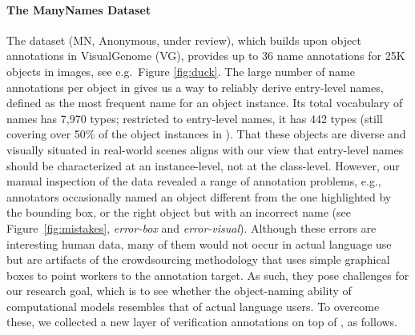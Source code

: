 \paragraph{The ManyNames Dataset}
The \mn dataset (MN, Anonymous, under review), which builds upon object annotations in VisualGenome (VG), provides up to 36 name annotations for 25K objects in images, see e.g.\ Figure \ref{fig:duck}.
The large number of name annotations per object in \mn gives us a way to reliably derive entry-level names, defined as the most frequent name for an object instance.
Its total vocabulary of names has 7,970 types; restricted to entry-level names, it has 442 types (still covering over 50\% of the object instances in \vg).
That these objects are diverse and visually situated in real-world scenes aligns with our view that entry-level names should be characterized at an instance-level, not at the class-level.
However, our manual inspection of the \mn data revealed a range of annotation problems, e.g., annotators occasionally named an object different from the one highlighted by the bounding box, or the right object but with an incorrect name (see Figure~\ref{fig:mistakes}, {\it error-box} and {\it error-visual}).
Although these errors are interesting human data, many of them would not occur in actual language use but are artifacts of the crowdsourcing methodology that uses simple graphical boxes to point workers to the annotation target.
As such, they pose challenges for our research goal, which is to see whether the object-naming ability of computational models resembles that of actual language users.
To overcome these, we collected a new layer of verification annotations on top of \mn, as follows.


